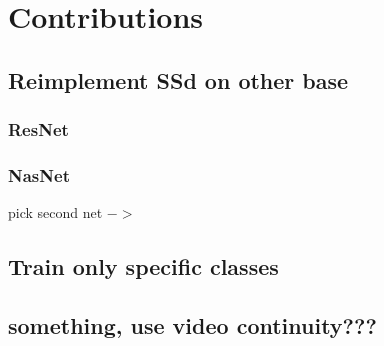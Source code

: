 \chapter{Contributions}

\section{Reimplement SSd on other base}
\subsection{ResNet}
\subsection{NasNet}
pick second net $->$ \cite{bib:benchmark}

\section{Train only specific classes}

\section{something, use video continuity???}